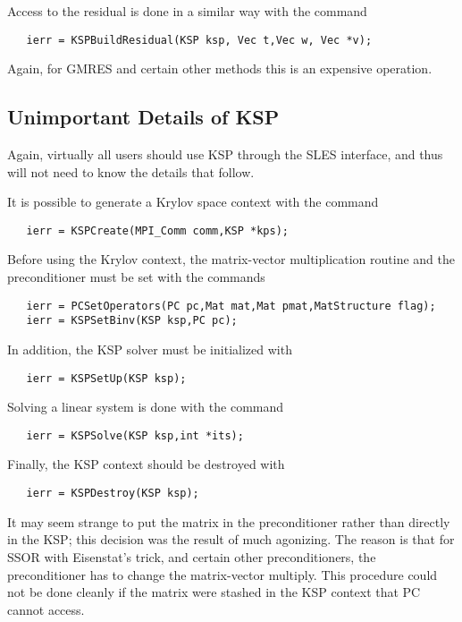 Access to the residual is done in a similar way with the 
command 
\begin{verbatim}
   ierr = KSPBuildResidual(KSP ksp, Vec t,Vec w, Vec *v);
\end{verbatim}
Again, for GMRES and certain other methods this is an expensive 
operation.

\subsection{Unimportant Details of KSP}

Again, virtually all users should use KSP through the SLES interface, 
and thus will not need to know the details that follow. 

It is possible to generate a Krylov space context with the 
command 
\begin{verbatim}
   ierr = KSPCreate(MPI_Comm comm,KSP *kps);
\end{verbatim}
Before using the Krylov context, the matrix-vector multiplication routine and
the preconditioner must be set with the 
commands  
\begin{verbatim}
   ierr = PCSetOperators(PC pc,Mat mat,Mat pmat,MatStructure flag);
   ierr = KSPSetBinv(KSP ksp,PC pc);
\end{verbatim}
In addition, the KSP solver must be initialized with 
\begin{verbatim}
   ierr = KSPSetUp(KSP ksp);
\end{verbatim}
Solving a linear system is done with the command 
\begin{verbatim}
   ierr = KSPSolve(KSP ksp,int *its);
\end{verbatim}
Finally, the KSP context should be destroyed with 
\begin{verbatim}
   ierr = KSPDestroy(KSP ksp);
\end{verbatim}

\begin{design} 
It may seem strange to put the matrix in the preconditioner rather
than directly in the KSP; this decision was the result of much
agonizing. The reason is that for SSOR with Eisenstat's trick, and 
certain other preconditioners, the
preconditioner has to change the matrix-vector multiply.  This 
procedure could not
be done cleanly if the matrix were stashed in the KSP context that
PC cannot access.
\end{design}

